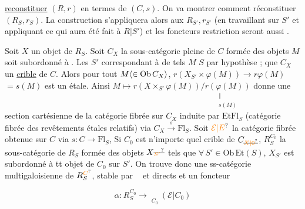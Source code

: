 
\uline{reconstituer} $(R,r)$ en termes de $(C,s)$. On va montrer comment réconstituer $(R_S,r_S)$. La construction s'appliquera alors aux $R_{S'},r_{S'}$ (en travaillant sur $S'$ et appliquant ce qui  aura été fait à $R|S'$) et les foncteurs restriction seront aussi .

Soit $X$ un objet de $R_S$. Soit $C_X$ la sous-catégorie pleine de $C$ formée des objets $M$   soit  subordonné à . Les $S'$ correspondant à de tels $M$  \uline{} $S$ par hypothèse ;    que $C_X$  un \uline{crible}  de $C$.  Alors pour tout  $M\inserted{\in\mathrm{Ob}\,C_X}$, $r(X_{S'}\times\varphi(M))\longrightarrow r\varphi(M)$ $=s(M)$ est un  étale.  Ainsi $M\longmapsto r(X\times_{S'}\varphi(M))/\underset{\substack{\Vert\\s(M)}}{r(\varphi(M))}$ donne une section cartésienne de la catégorie fibrée sur $C_X$ induite par  $\mathrm{EtFl}_S$ (catégorie fibrée  des revêtements étales relatifs) via $C_X\xrightarrow{s}\mathrm{Fl}_S$.  Soit $\unsure{\mathcal E|E}$ la catégorie fibrée obtenue  sur $C$ via $s:C\longrightarrow\mathrm{Fl}_S$,  Si $C_0$ est n'importe quel crible de $C_{\deleted{\unsure{X|0}}}$,   $R_S^{C_0}$  la sous-catégorie  de $R_S$ formée des objets $X\deleted{\unsure{_{S'}}}$ tels que $\forall\,S'\in\mathrm{Ob}\,\mathrm{Et}(S)$,  $X_{S'}$ est  subordonné à tt objet de $C_0$ sur $S'$. On trouve donc une ss-catégorie multigaloisienne de $R_S^{\unsure{C}}$, stable par $\mathop{\underleftarrow{\mathrm{Lim}}}\limits$ et   directs et un foncteur

\[
\alpha:R_S^{C_0}\longrightarrow\mathop{\underleftarrow{\mathrm{Lim}}}\limits_{C_0}(\mathcal E|C_0)
\tag*{$(*)$}
\]

